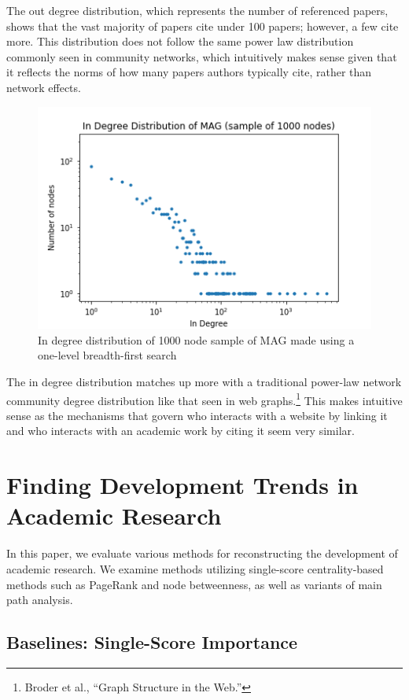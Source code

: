 \documentclass[lettepaper,]{article}
\begin{document}
The out degree distribution, which represents the number of referenced
papers, shows that the vast majority of papers cite under 100 papers;
however, a few cite more. This distribution does not follow the same
power law distribution commonly seen in community networks, which
intuitively makes sense given that it reflects the norms of how many
papers authors typically cite, rather than network effects.

\begin{figure}
\centering
\includegraphics{./indeg.png}
\caption{In degree distribution of 1000 node sample of MAG made using a
one-level breadth-first search}
\end{figure}

The in degree distribution matches up more with a traditional power-law
network community degree distribution like that seen in web
graphs.\footnote{Broder et al., ``Graph Structure in the Web.''} This
makes intuitive sense as the mechanisms that govern who interacts with a
website by linking it and who interacts with an academic work by citing
it seem very similar.

\hypertarget{finding-development-trends-in-academic-research}{%
\section{Finding Development Trends in Academic
Research}\label{finding-development-trends-in-academic-research}}

In this paper, we evaluate various methods for reconstructing the
development of academic research. We examine methods utilizing
single-score centrality-based methods such as PageRank and node
betweenness, as well as variants of main path analysis.

\hypertarget{baselines-single-score-importance}{%
\subsection{Baselines: Single-Score
Importance}\label{baselines-single-score-importance}}
\end{document}
